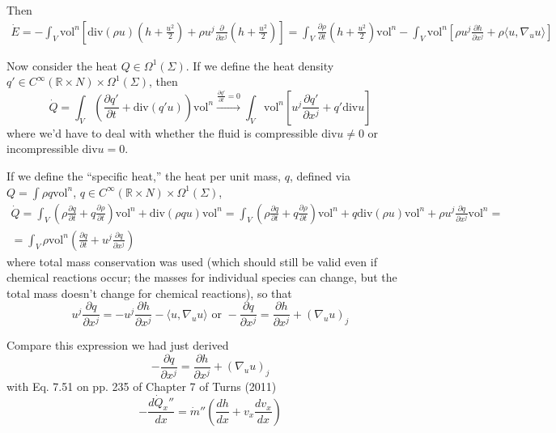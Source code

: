 \documentclass[10pt]{amsart}
\begin{document}
\begin{multicols*}{2}
Then
\[
\begin{gathered}
  \dot{E} = -\int_V \text{vol}^n \left[ \text{div}(\rho u)(h + \frac{u^2}{2} ) + \rho u^j \frac{ \partial }{ \partial x^j} (h+ \frac{u^2}{2} ) \right] = \int_V \frac{ \partial \rho }{ \partial t}(h+ \frac{u^2}{2} )\text{vol}^n - \int_V \text{vol}^n \left[ \rho u^j \frac{ \partial h}{ \partial x^j} + \rho \langle u, \nabla_u u \rangle \right]
\end{gathered}
\]

Now consider the heat $Q \in \Omega^1(\Sigma)$.  If we define the heat density $q' \in C^{\infty}(\mathbb{R} \times N) \times \Omega^1(\Sigma)$, then
\[
\dot{Q} = \int_V \left( \frac{ \partial q'}{ \partial t} + \text{div}(q'u) \right) \text{vol}^n \xrightarrow{ \frac{ \partial q'}{ \partial t} = 0 } \int_V \text{vol}^n \left[ u^j \frac{ \partial q' }{ \partial x^j } + q' \text{div}u \right]
\]
where we'd have to deal with whether the fluid is compressible $\text{div}u\neq 0$ or incompressible $\text{div}u =0$.  

If we define the ``specific heat,'' the heat per unit mass, $q$, defined via $Q = \int \rho q \text{vol}^n$, $q \in C^{\infty}(\mathbb{R}\times N) \times \Omega^1(\Sigma)$,
\[
\begin{gathered}
  \dot{Q} = \int_V \left( \rho \frac{ \partial q}{ \partial t} + q \frac{ \partial \rho }{ \partial t} \right) \text{vol}^n + \text{div}(\rho q u) \text{vol}^n = \int_V \left( \rho \frac{ \partial q}{ \partial t} + q \frac{ \partial \rho}{ \partial t} \right) \text{vol}^n + q\text{div}(\rho u) \text{vol}^n + \rho u^j \frac{ \partial q}{ \partial x^j} \text{vol}^n  = \\
   = \int_V \rho \text{vol}^n \left( \frac{ \partial q }{ \partial t} + u^j \frac{ \partial q}{ \partial x^j } \right)
\end{gathered}
\]where total mass conservation was used (which should still be valid even if chemical reactions occur; the masses for individual species can change, but the total mass doesn't change for chemical reactions),
so that 
\[
u^j \frac{ \partial q}{ \partial x^j} = -u^j \frac{ \partial h }{ \partial x^j} - \langle u , \nabla_u u \rangle \text{ or } - \frac{ \partial q}{ \partial x^j} = \frac{ \partial h}{ \partial x^j} + ( \nabla_u u)_j
\]

Compare this expression we had just derived
\begin{equation}
  - \frac{ \partial q}{ \partial x^j} = \frac{ \partial h}{ \partial x^j} + ( \nabla_u u)_j
\end{equation}
with Eq. 7.51 on pp. 235 of Chapter 7 of Turns (2011) \cite{STurns2011}
\[
-\frac{d \dot{Q}_x''}{ dx} = \dot{m}'' \left( \frac{dh}{dx} + v_x \frac{d v_x}{ dx} \right)
\]



\end{multicols*}
\end{document}
